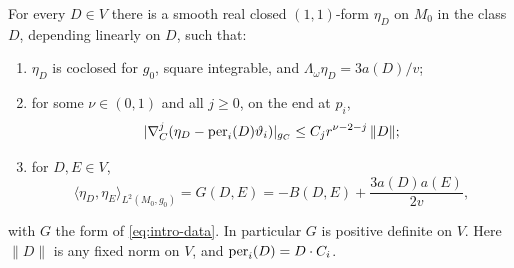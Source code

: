\begin{proposition}\label{prop:harmonic}
For every $D\in V$ there is a smooth real closed $(1,1)$-form $\eta_D$ on
$M_0$ in the class $D$, depending linearly on $D$, such that:
\begin{enumerate}
\item $\eta_D$ is coclosed for $g_0$, square integrable, and
$\Lambda_\omega\eta_D=3a(D)/v$;
\item for some $\nu\in(0,1)$ and all $j\ge0$, on the end at $p_i$,
\begin{equation}\label{eq:eta-expansion}
 |\nabla_C^j(\eta_D-\operatorname{per}_i(D)\vartheta_i)|_{g_C}\le C_jr^{\nu-2-j}\,\|D\| ;
\end{equation}
\item for $D,E\in V$,
\begin{equation}\label{eq:gram}
 \langle\eta_D,\eta_E\rangle_{L^2(M_0,g_0)}=G(D,E)
 =-B(D,E)+\frac{3a(D)a(E)}{2v},
\end{equation}
\end{enumerate}
with $G$ the form of \eqref{eq:intro-data}. In particular $G$ is positive
definite on $V$. Here $\|D\|$ is any fixed norm on $V$, and
$\operatorname{per}_i(D)=D\cdot C_i$.
\end{proposition}
